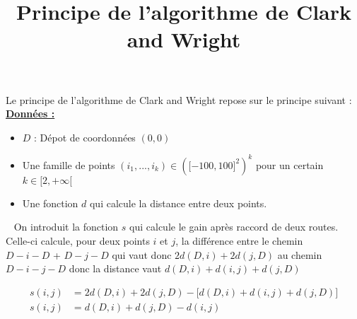 \documentclass[14pt]{article}
\title{Principe de l'algorithme de Clark and Wright}
\author{}
\date{}
\begin{document}
\maketitle

\noindent Le principe de l'algorithme de Clark and Wright repose sur le principe suivant :
\\ \newline
\underline{\textbf{Données :}}
\begin{itemize}[label=•]
    \item $D$ : Dépot de coordonnées $(0,0)$
    \item Une famille de points \((i_1,...,i_k) \in {(\lbrack-100,100\rbrack^2)}^k\) pour un certain $k \in \lbrack2,+\infty\lbrack$
    \item Une fonction $d$ qui calcule la distance entre deux points.
\end{itemize}
\ \newline
On introduit la fonction $s$ qui calcule le gain après raccord de deux routes. Celle-ci calcule, pour deux points $i$ et $j$, la différence entre le chemin \\ $D-i-D$ + $D-j-D$ qui vaut donc $2d(D,i) + 2d(j,D)$ au chemin $D-i-j-D$ donc la distance vaut $d(D,i) + d(i,j) + d(j,D)$

\begin{align*}
    s(i,j) &= 2d(D,i) + 2d(j,D) - \lbrack d(D,i) + d(i,j) + d(j,D)\rbrack \\
    s(i,j) &= d(D,i) + d(j,D) - d(i,j)
\end{align*}
\end{document}
